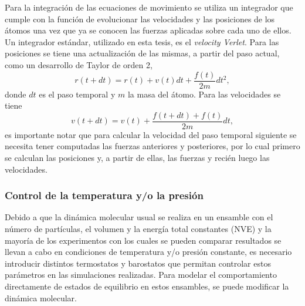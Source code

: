 Para la integración de las ecuaciones de movimiento se utiliza un integrador que 
cumple con la función de evolucionar las velocidades y las posiciones de los 
átomos una vez que ya se conocen las fuerzas aplicadas sobre cada uno de ellos.
Un integrador estándar, utilizado en esta tesis, es el \textit{velocity Verlet}. 
Para las posiciones se tiene una actualización de las mismas, a partir
del paso actual, como un desarrollo de Taylor de orden 2,
\begin{equation}
    r(t+dt) = r(t) + v(t) dt + \frac{f(t)}{2m} dt^2,
\end{equation}
donde $dt$ es el paso temporal y $m$ la masa del átomo. Para las velocidades se
tiene
\begin{equation}
    v(t+dt) = v(t) + \frac{f(t+dt)+f(t)}{2m} dt,
\end{equation}
es importante notar que para calcular la velocidad del paso temporal siguiente se
necesita tener computadas las fuerzas anteriores y posteriores, por lo cual
primero se calculan las posiciones y, a partir de ellas, las fuerzas y recién 
luego las velocidades. %


\subsubsection{Control de la temperatura y/o la presión}

Debido a que la dinámica molecular usual se realiza en un ensamble con el número 
de partículas, el volumen y la energía total constantes (NVE) y la mayoría de los
experimentos con los cuales se pueden comparar resultados se llevan a cabo en 
condiciones de temperatura y/o presión constante, es necesario introducir 
distintos termostatos y barostatos que permitan controlar estos parámetros en las 
simulaciones realizadas. Para modelar el comportamiento directamente de estados
de equilibrio en estos ensambles, se puede modificar la dinámica molecular. %

